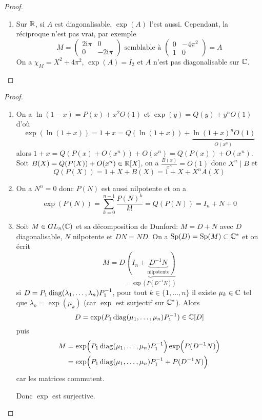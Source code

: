 \begin{proof}
\begin{enumerate}
		\item Sur $\mathbb{R}$, si $A$ est diagonalisable, $\exp(A)$ l'est aussi. Cependant, la réciproque n'est pas vrai, par exemple
		\begin{equation}M=\begin{pmatrix}
			2\mathrm{i}\pi & 0\\
			0 & -2\mathrm{i}\pi
		\end{pmatrix}\text{  semblable à }
		\begin{pmatrix}
			0 & -4\pi^{2}\\
			1 & 0
		\end{pmatrix}=A\end{equation}
		On a $\chi_{M}=X^{2}+4\pi^{2}$, $\exp(A)=I_{2}$ et $A$ n'est pas diagonalisable sur $\mathbb{C}$.
	\end{enumerate}
\end{proof}

\begin{proof}
	\phantom{}
	\begin{enumerate}
		\item On a $\ln(1-x)=P(x)+x^{2}O(1)$ et $\exp(y)=Q(y)+y^{n}O(1)$ d'où 
		\begin{equation}\exp(\ln(1+x))=1+x=Q(\ln(1+x))+\underbrace{\ln(1+x)^{n}O(1)}_{O(x^{n})}\end{equation}
		alors $1+x=Q(P(x)+O(x^{n}))+O(x^{n})=Q(P(x))+O(x^{n})$. Soit $B(X)=Q(P(X))+O(x^{n})\in\mathbb{R}[X]$, on a $\frac{B(x)}{x^{n}}=O(1)$ donc $X^{n}\mid B$ et \begin{equation}Q(P(X))=1+X+B(X)=1+X+X^{n}A(X)\end{equation}

		\item On a $N^{n}=0$ donc $P(N)$ est aussi nilpotente et on a 
		\begin{equation}\exp(P(N))=\sum_{k=0}^{n-1}\frac{P(N)^{k}}{k!}=Q(P(N))=I_{n}+N+0\end{equation}

		\item Soit $M\in GL_{n}(\mathbb{C})$ et sa décomposition de Dunford: $M=D+N$ avec $D$ diagonalisable, $N$ nilpotente et $DN=ND$. On a $\operatorname{Sp}(D)=\operatorname{Sp}(M)\subset\mathbb{C}^{*}$ et on écrit
		\begin{equation}M=D\underbrace{(I_{n}+\underbrace{D^{-1}N}_{\text{nilpotente}})}_{=\exp(P(D^{-1}N))}\end{equation}
		si $D=P_{1}\operatorname{diag}(\lambda_{1},\dots,\lambda_{n})P_{1}^{-1}$, pour tout $k\in\{1,\dots,n\}$ il existe $\mu_{k}\in\mathbb{C}$ tel que $\lambda_{k}=\exp(\mu_{k})$ (car $\exp$ est surjectif sur $\mathbb{C}^{*}$). Alors 
		\begin{equation}
		D=\exp(P_{1}\operatorname{diag}(\mu_{1},\dots,\mu_{n})P_{1}^{-1})\in\mathbb{C}[D]
		\end{equation}
		puis 
		\begin{align}
			M
			&=\exp\Bigl(P_{1}\operatorname{diag}(\mu_{1},\dots,\mu_{n})P_{1}^{-1}\Bigr)\exp\Bigl(P(D^{-1}N)\Bigr)\\
			&=\exp\Bigl(P_{1}\operatorname{diag}(\mu_{1},\dots,\mu_{n})P_{1}^{-1}+P(D^{-1}N)\Bigr)
		\end{align}
		car les matrices commutent.

		Donc $\exp$ est surjective.
	\end{enumerate}
\end{proof}

